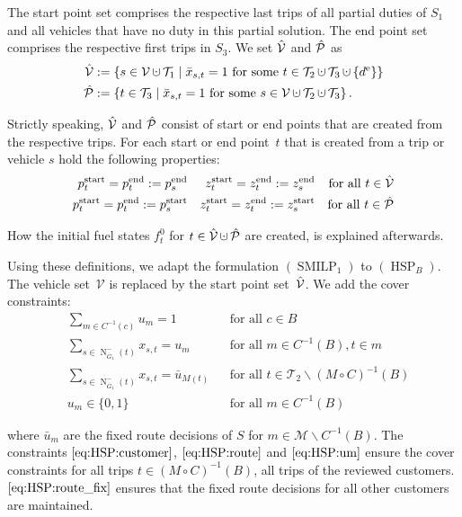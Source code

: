 The start point set comprises the respective last trips of all partial duties of $S_1$ and all vehicles that have no duty in this partial solution. The end point set comprises the respective first trips in $S_3$. We set $\hat{\mathcal{V}}$ and $\hat{\mathcal{P}}$ as
\begin{align*}
	\Vhat & := \left\{s\in\mathcal{V}\cupdot\mathcal{T}_1\mid\bar{x}_{s,t}=1\text{ for some } t\in\mathcal{T}_2\cupdot\mathcal{T}_3\cupdot\left\{\de\right\}\right\} \\
	\Phat & := \left\{t\in\mathcal{T}_3\mid\bar{x}_{s,t}=1\text{ for some } s\in\mathcal{V}\cupdot\mathcal{T}_2\cupdot\mathcal{T}_3\right\}.
\end{align*}

Strictly speaking, $\hat{\mathcal{V}}$ and $\hat{\mathcal{P}}$ consist of start or end points that are created from the respective trips. For each start or end point~$t$ that is created from a trip or vehicle $s$ hold the following properties:
\begin{align*}
	p^{\operatorname{start}}_t = p^{\operatorname{end}}_t := p^{\operatorname{end}}_s && z^{\operatorname{start}}_t = z^{\operatorname{end}}_t := z^{\operatorname{end}}_s && \text{for all } t\in\hat{\mathcal{V}} \\
	p^{\operatorname{start}}_t = p^{\operatorname{end}}_t := p^{\operatorname{start}}_s && z^{\operatorname{start}}_t = z^{\operatorname{end}}_t := z^{\operatorname{start}}_s && \text{for all } t\in\hat{\mathcal{P}}
\end{align*}

How the initial fuel states $f^0_t$ for ${t\in\Vhat\cupdot\Phat}$ are created, is explained afterwards.

Using these definitions, we adapt the formulation $(\operatorname{SMILP}_1)$ to $(\operatorname{HSP}_B)$. The vehicle set~$\mathcal{V}$ is replaced by the start point set~$\hat{\mathcal{V}}$. We add the cover constraints:
\begin{align}
	& \sum_{m\in C^{-1}(c)} u_m = 1 && \text{for all } c\in B \label{eq:HSP:customer} \\
	& \sum_{s\in\operatorname{N}_{\overline{G}_1}^-(t)} x_{s,t} = u_m && \text{for all } m\in C^{-1}(B),t\in m \label{eq:HSP:route} \\
	& \sum_{s\in\operatorname{N}_{\overline{G}_1}^-(t)} x_{s,t} = \bar{u}_{M(t)} && \text{for all } t\in\mathcal{T}_2\backslash(M\circ C)^{-1}(B) \label{eq:HSP:route_fix} \\
	& u_m\in\{0,1\} && \text{for all } m\in C^{-1}(B) \label{eq:HSP:um}
\end{align}

where $\bar{u}_m$ are the fixed route decisions of $S$ for ${m\in\mathcal{M}\backslash C^{-1}(B)}$. The constraints $\eqref{eq:HSP:customer}$, $\eqref{eq:HSP:route}$ and $\eqref{eq:HSP:um}$ ensure the cover constraints for all trips ${t\in(M\circ C)^{-1}(B)}$, \ie all trips of the reviewed customers. $\eqref{eq:HSP:route_fix}$ ensures that the fixed route decisions for all other customers are maintained. 

